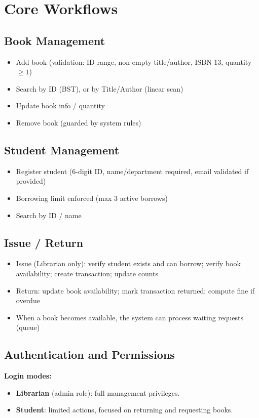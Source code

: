 \documentclass[11pt,a4paper]{article}
\begin{document}
\section{Core Workflows}
\subsection{Book Management}
\begin{itemize}
  \item Add book (validation: ID range, non-empty title/author, ISBN-13, quantity \(\ge 1\))
  \item Search by ID (BST), or by Title/Author (linear scan)
  \item Update book info / quantity
  \item Remove book (guarded by system rules)
\end{itemize}

\subsection{Student Management}
\begin{itemize}
  \item Register student (6-digit ID, name/department required, email validated if provided)
  \item Borrowing limit enforced (max 3 active borrows)
  \item Search by ID / name
\end{itemize}

\subsection{Issue / Return}
\begin{itemize}
  \item Issue (Librarian only): verify student exists and can borrow; verify book availability; create transaction; update counts
  \item Return: update book availability; mark transaction returned; compute fine if overdue
  \item When a book becomes available, the system can process waiting requests (queue)
\end{itemize}

\subsection{Authentication and Permissions}
\textbf{Login modes:}
\begin{itemize}
  \item \textbf{Librarian} (admin role): full management privileges.
  \item \textbf{Student}: limited actions, focused on returning and requesting books.
\end{itemize}
\end{document}
